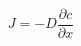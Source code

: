 \documentclass[preview]{standalone}
\begin{document}
\[J = -D \frac{\partial c}{\partial x} \tag{2.4}\]
\end{document}

